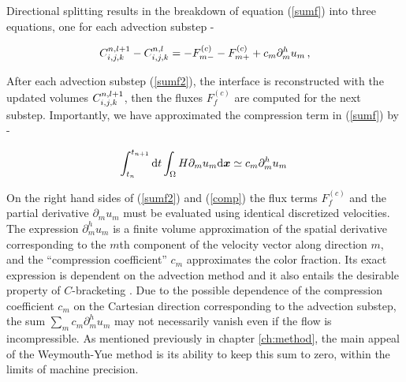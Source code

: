 Directional splitting results in the breakdown of equation (\ref{sumf}) 
into three equations, one for each advection substep -


\begin{align}
{C_{i,j,k}^{n,l+1} - C_{i,j,k}^{n,l}} = - F^{(c)}_{m-} - F^{(c)}_{m+} 
+ c_m \partial_{m}^h u_m \,,
\label{sumf2}
\end{align}



After each advection substep (\ref{sumf2}), the interface is reconstructed
with the updated volumes $C_{i,j,k}^{n,l+1}$, then the 
fluxes $F^{(c)}_{f}$ are computed for the next substep. 
Importantly, we have approximated the compression term in (\ref{sumf}) by -

\begin{align}
	\int_{t_n}^{t_{n+1}}  {\textrm {d}}t \int_\Omega  H \partial_m u_m  {\textrm {d}}\boldsymbol{x} \simeq  c_m 
 \partial_{m}^h u_m \, 
 \label{comp}
\end{align}


On the right hand sides of (\ref{sumf2}) and (\ref{comp}) 
the flux terms $F_{f}^{(c)}$ and the 
 partial derivative $\partial_{m} u_m$ must
be evaluated using identical discretized velocities.
The expression $\partial_{m}^h u_m$ is a finite volume approximation of the 
spatial derivative corresponding to the $m$th component 
of the velocity vector along direction $m$, and
the ``compression coefficient'' $c_m$ approximates the color fraction. 
Its exact expression is dependent on the advection method
and it also entails the desirable property of $C$-bracketing
. 
Due to the possible dependence of the 
compression coefficient $c_m$ on the Cartesian direction
corresponding to the advection substep, 
the sum $\sum_m c_m \partial_{m}^h u_m$ may not necessarily vanish
even if the flow is incompressible.
As mentioned previously in chapter \ref{ch:method}, the main appeal
of the Weymouth-Yue method is its ability to keep this sum to zero,
within the limits of machine precision. 


